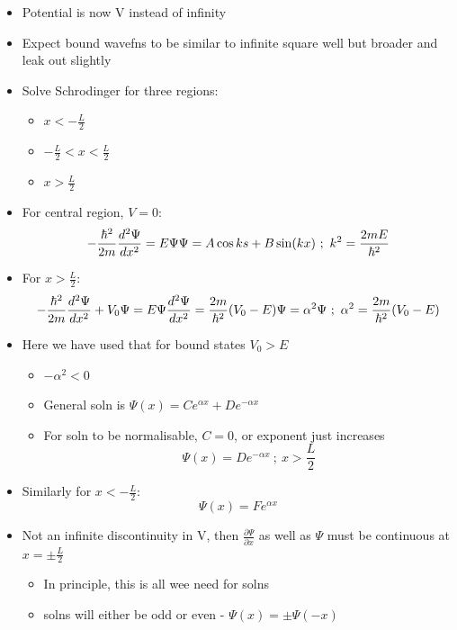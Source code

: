 \documentclass[a4paper,11pt,normalem]{article}
\begin{document}
\begin{itemize}
\item
  Potential is now V instead of infinity
\item
  Expect bound wavefns to be similar to infinite square well but broader
  and leak out slightly
\item
  Solve Schrodinger for three regions:
  \begin{itemize}
  \item
    \(x < -\frac{L}{2}\)
  \item
    \(-\frac{L}{2} < x < \frac{L}{2}\)
  \item
    \(x > \frac{L}{2}\)
  \end{itemize}
\item
  For central region, \(V = 0\): \[
  -\frac{\hbar^2}{2m} \frac{d^2 \Psi}{dx^2} = E\Psi \\
  \Psi = A\cos{ks} + B\sin(kx) ~;~ k^2 = \frac{2mE}{\hbar^2}
  \]
\item
  For \(x > \frac{L}{2}\): \[
  -\frac{\hbar^2}{2m} \frac{d^2 \Psi}{dx^2} + V_0 \Psi = E\Psi \\
  \frac{d^2 \Psi}{dx^2} = \frac{2m}{\hbar^2}(V_0 - E)\Psi = \alpha^2 \Psi ~;~ \alpha^2 = \frac{2m}{\hbar^2}(V_0 - E)
  \]
\item
  Here we have used that for bound states \(V_0 > E\)
  \begin{itemize}
  \item
    \(-\alpha^2 < 0\)
  \item
    General soln is \(\Psi(x) = Ce^{\alpha x} + De^{-\alpha x}\)
  \item
    For soln to be normalisable, \(C = 0\), or exponent just increases
    \[
    \Psi(x) = De^{-\alpha x} ~;~ x > \frac{L}{2}
    \]
  \end{itemize}
\item
  Similarly for \(x < -\frac{L}{2}\): \[
  \Psi(x) = Fe^{\alpha x}
  \]
\item
  Not an infinite discontinuity in V, then
  \(\frac{\partial \Psi}{\partial x}\) as well as \(\Psi\) must be
  continuous at \(x = \pm \frac{L}{2}\)
  \begin{itemize}
  \item
    In principle, this is all wee need for solns
  \item
    solns will either be odd or even - \(\Psi(x) = \pm \Psi(-x)\)
  \end{itemize}
\end{itemize}
\end{document}
